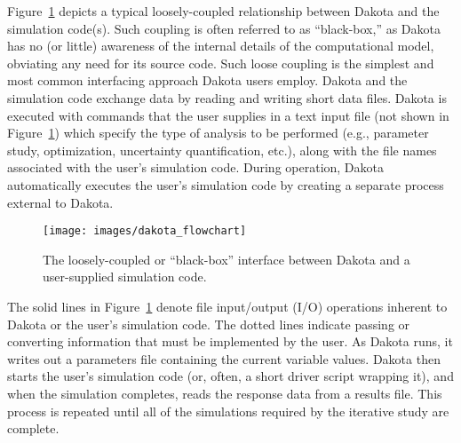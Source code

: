 Figure~\ref{intro:bbinterface} depicts a typical loosely-coupled
relationship between Dakota and the simulation code(s). Such coupling
is often referred to as ``black-box,'' as Dakota has no (or little)
awareness of the internal details of the computational model,
obviating any need for its source code. Such loose coupling is the
simplest and most common interfacing approach Dakota users
employ. Dakota and the simulation code exchange data by reading and
writing short data files. Dakota is executed with commands that the
user supplies in a text input file (not shown in
Figure~\ref{intro:bbinterface}) which specify the type of analysis to
be performed (e.g., parameter study, optimization, uncertainty
quantification, etc.), along with the file names associated with the
user's simulation code. During operation, Dakota automatically
executes the user's simulation code by creating a separate process
external to Dakota.

\begin{figure}
  \centering
  \texttt{[image: images/dakota\_flowchart]}
  \caption{The loosely-coupled or ``black-box'' interface between
    Dakota and a user-supplied simulation code.}
  \label{intro:bbinterface}
\end{figure}

The solid lines in Figure~\ref{intro:bbinterface} denote file
input/output (I/O) operations inherent to Dakota or the user's
simulation code. The dotted lines indicate passing or converting
information that must be implemented by the user. As Dakota runs, it
writes out a parameters file containing the current variable values.
Dakota then starts the user's simulation code (or, often, a short
driver script wrapping it), and when the simulation completes, reads
the response data from a results file. This process is repeated until
all of the simulations required by the iterative study are complete.


